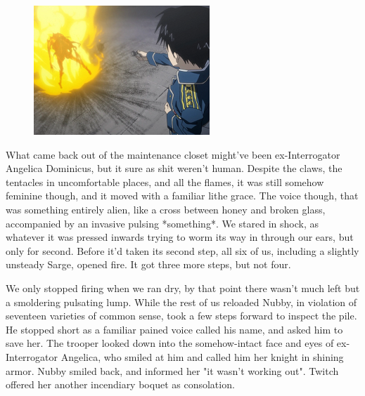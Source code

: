 \begin{figure}
	\begin{center}
		\includegraphics[width=\figwidth]{pics/19/45.png}
	\end{center}
\end{figure}
What came back out of the maintenance closet might've been ex-Interrogator Angelica Dominicus, but it sure as shit weren't human. 
Despite the claws, the tentacles in uncomfortable places, and all the flames, it was still somehow feminine though, and it moved with a familiar lithe grace. 
The voice though, that was something entirely alien, like a cross between honey and broken glass, accompanied by an invasive pulsing *something*. 
We stared in shock, as whatever it was pressed inwards trying to worm its way in through our ears, but only for second. 
Before it'd taken its second step, all six of us, including a slightly unsteady Sarge, opened fire. 
It got three more steps, but not four.

We only stopped firing when we ran dry, by that point there wasn't much left but a smoldering pulsating lump. 
While the rest of us reloaded Nubby, in violation of seventeen varieties of common sense, took a few steps forward to inspect the pile. 
He stopped short as a familiar pained voice called his name, and asked him to save her. 
The trooper looked down into the somehow-intact face and eyes of ex-Interrogator Angelica, who smiled at him and called him her knight in shining armor. 
Nubby smiled back, and informed her "it wasn't working out". 
Twitch offered her another incendiary boquet as consolation.

